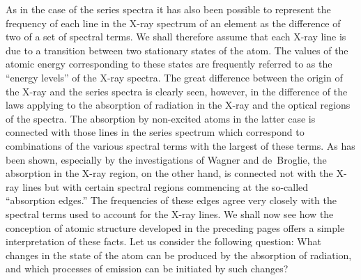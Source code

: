 As in the case of the series spectra it has also been possible to represent
the frequency of each line in the X-ray spectrum of an element
as the difference of two of a set of spectral terms. We shall therefore
assume that each X-ray line is due to a transition between
two stationary states of the atom. The values of the atomic energy
corresponding to these states are frequently referred to as the
``energy levels'' of the X-ray spectra. The great difference between
the origin of the X-ray and the series spectra is clearly seen, however,
in the difference of the laws applying to the absorption of
radiation in the X-ray and the optical regions of the spectra. The
absorption by non-excited atoms in the latter case is connected
with those lines in the series spectrum which correspond to combinations
of the various spectral terms with the largest of these
terms. As has been shown, especially by the investigations of
Wagner and de~Broglie, the absorption in the X-ray region, on
the other hand, is connected not with the X-ray lines but with
certain spectral regions commencing at the so-called ``absorption
edges.'' The frequencies of these edges agree very closely with the
spectral terms used to account for the X-ray lines. We shall now
see how the conception of atomic structure developed in the preceding
pages offers a simple interpretation of these facts. Let us
consider the following question: What changes in the state of the
atom can be produced by the absorption of radiation, and which
processes of emission can be initiated by such changes?

